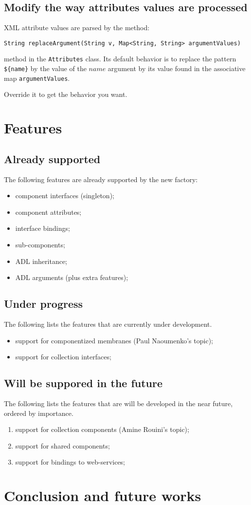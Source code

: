 \documentclass{article}
\newcommand{\code}[1]{\texttt{#1}}
\begin{document}
\subsection{Modify the way attributes values are processed}

XML attribute values are parsed by the method:

\code{String replaceArgument(String v, Map<String, String> argumentValues)}

method in the \code{Attributes} class.
Its default behavior is to replace the pattern \code{\$\{name\}} by the value of the $name$ argument by its value
found in the associative map \code{argumentValues}.

Override it to get the behavior you want.



\section{Features}
\subsection{Already supported}

The following features are already supported by the new factory:
\begin{itemize}
  \item component interfaces (singleton);
  \item component attributes;
  \item interface bindings;
  \item sub-components;
  \item ADL inheritance;
  \item ADL arguments (plus extra features);
\end{itemize}

\subsection{Under progress}
The following lists the features that are currently under development.
\begin{itemize}
  \item support for componentized membranes (Paul Naoumenko's topic);
  \item support for collection interfaces;
\end{itemize}

\subsection{Will be suppored in the future}
The following lists the features that are will be developed in the near future, ordered by importance.
\begin{enumerate}
  \item support for collection components (Amine Rouini's topic);
  \item support for shared components;
  \item support for bindings to web-services;
\end{enumerate}

\section{Conclusion and future works}
\end{document}
